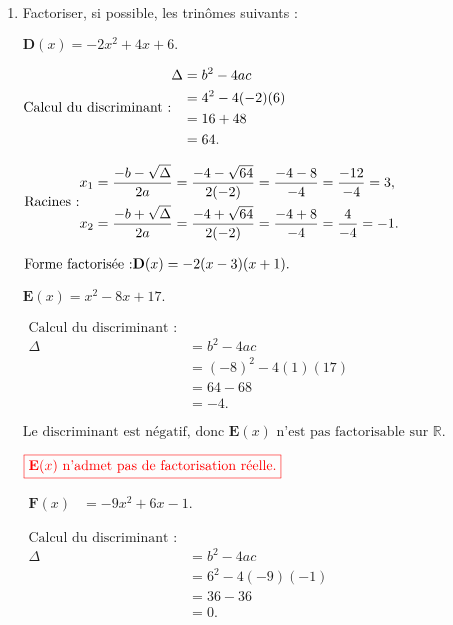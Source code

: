 \documentclass[12pt,a4paper]{article}
\begin{document}
\begin{enumerate}
\item Factoriser, si possible, les trinômes suivants :

$
\textbf{D}(x) = -2x^2 + 4x + 6.
$

\(
\text{Calcul du discriminant :}\\
\begin{aligned}
\Delta &= b^2 - 4ac \\
       &= 4^2 - 4(-2)(6) \\
       &= 16 + 48 \\
       &= 64.
\end{aligned}
\)

\(
\text{Racines :}\\
\begin{aligned}
x_1 &= \frac{-b - \sqrt{\Delta}}{2a} = \frac{-4 - \sqrt{64}}{2(-2)} = \frac{-4 - 8}{-4} = \frac{-12}{-4} = 3, \\
x_2 &= \frac{-b + \sqrt{\Delta}}{2a} = \frac{-4 + \sqrt{64}}{2(-2)} = \frac{-4 + 8}{-4} = \frac{4}{-4} = -1.
\end{aligned}
\)

\(\text{Forme factorisée :}\\
\begin{aligned}
\textbf{D}(x) &= -2(x - 3)(x + 1).
\end{aligned}
\)

\textcolor{red}{}

\(
\textbf{E}(x) = x^2 - 8x + 17.
\)

\(
\begin{aligned}
\text{Calcul du discriminant :} \\
\Delta &= b^2 - 4ac \\
      &= (-8)^2 - 4(1)(17) \\
      &= 64 - 68 \\
      &= -4.
\end{aligned}
\)

\(
\text{Le discriminant est négatif, donc } \textbf{E}(x) \text{ n'est pas factorisable sur } \mathbb{R}.
\)

\(
\textcolor{red}{\boxed{\textbf{E}(x) \text{ n'admet pas de factorisation réelle.}}}
\)

\(
\begin{aligned}
\textbf{F}(x) &= -9x^2 + 6x - 1.
\end{aligned}
\)

\(
\begin{aligned}
\text{Calcul du discriminant :} \\
\Delta &= b^2 - 4ac \\
      &= 6^2 - 4(-9)(-1) \\
      &= 36 - 36 \\
      &= 0.
\end{aligned}
\)


\end{enumerate}
\end{document}
